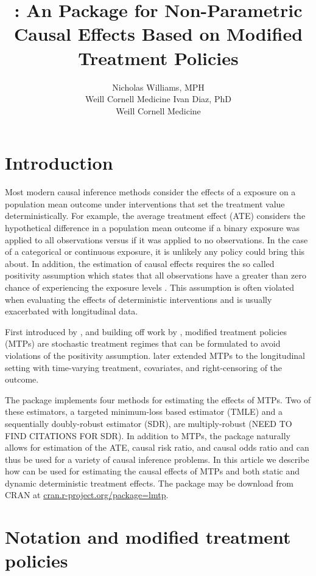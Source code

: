 \documentclass[]{jss}
\author{
Nicholas Williams, MPH\\Weill Cornell Medicine \And Ivan Diaz,
PhD\\Weill Cornell Medicine
}
\title{\pkg{lmtp}: An \proglang{R} Package for Non-Parametric Causal
Effects Based on Modified Treatment Policies}
\begin{document}
\hypertarget{introduction}{%
\section{Introduction}\label{introduction}}

Most modern causal inference methods consider the effects of a exposure
on a population mean outcome under interventions that set the treatment
value deterministically. For example, the average treatment effect (ATE)
considers the hypothetical difference in a population mean outcome if a
binary exposure was applied to all observations versus if it was applied
to no observations. In the case of a categorical or continuous exposure,
it is unlikely any policy could bring this about. In addition, the
estimation of causal effects requires the so called positivity
assumption which states that all observations have a greater than zero
chance of experiencing the exposure levels
\citep{rosenbaumCentralRolePropensity1983}. This assumption is often
violated when evaluating the effects of deterministic interventions and
is usually exacerbated with longitudinal data.

First introduced by \citet{haneuseEstimationEffectInterventions2013},
and building off work by \citet{munozPopulationInterventionCausal2012},
modified treatment policies (MTPs) are stochastic treatment regimes that
can be formulated to avoid violations of the positivity assumption.
\citet{diazNonparametricCausalEffects2020a} later extended MTPs to the
longitudinal setting with time-varying treatment, covariates, and
right-censoring of the outcome.

The package  implements four methods for estimating the
effects of MTPs. Two of these estimators, a targeted minimum-loss based
estimator (TMLE) and a sequentially doubly-robust estimator (SDR), are
multiply-robust
\citep{laanTargetedLearningCausal2011a, laanTargetedMaximumLikelihood2006}
(NEED TO FIND CITATIONS FOR SDR). In addition to MTPs, the package
naturally allows for estimation of the ATE, causal risk ratio, and
causal odds ratio and can thus be used for a variety of causal inference
problems. In this article we describe how  can be used for
estimating the causal effects of MTPs and both static and dynamic
deterministic treatment effects. The package may be download from CRAN
at \url{cran.r-project.org/package=lmtp}.

\hypertarget{notation-and-modified-treatment-policies}{%
\section{Notation and modified treatment
policies}\label{notation-and-modified-treatment-policies}}
\end{document}

